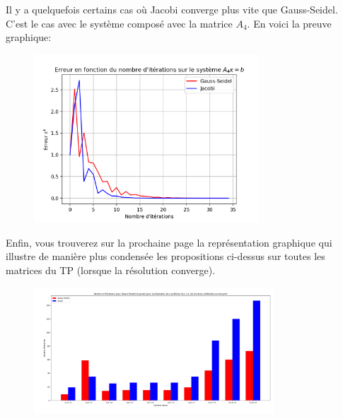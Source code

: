 \newpage
Il y a quelquefois certains cas où Jacobi converge plus vite que Gauss-Seidel. C'est le cas avec le système composé avec la matrice $A_4$.
En voici la preuve graphique:
\begin{figure}[H]
    \centering
    \includegraphics[width=0.75\textwidth]{graphes/graphs/resA4.png}
\end{figure}

Enfin, vous trouverez sur la prochaine page la représentation graphique qui illustre de manière plus condensée les propositions ci-dessus sur toutes les matrices du TP (lorsque la résolution converge).
\begin{figure}[H]
    \centering
    \includegraphics[angle=90, width=0.8\textwidth]{graphes/graphs/baton.png}
\end{figure}
% 

